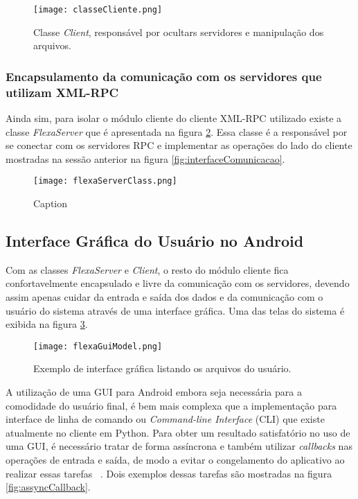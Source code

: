         \begin{figure}[!ht]
        \centering
        \texttt{[image: classeCliente.png]}
        \caption{Classe \textit{Client}, responsável por ocultars servidores e manipulação dos arquivos.}
        \label{fig:clientClass}
        \end{figure}
        
        
         \subsubsection{Encapsulamento da comunicação com os servidores que utilizam XML-RPC}
         
        Ainda sim, para isolar o módulo cliente do cliente XML-RPC utilizado existe a classe \textit{FlexaServer} que é apresentada na figura \ref{fig:flexaServer}. Essa classe é a responsável por se conectar com os servidores RPC e implementar as operações  do lado do cliente mostradas na sessão anterior na figura \ref{fig:interfaceComunicacao}.
        
        \begin{figure}[!ht]
        \centering
        \texttt{[image: flexaServerClass.png]}
        \caption{Caption}
        \label{fig:flexaServer}
        \end{figure}
        
        
        \subsection{Interface Gráfica do Usuário no Android}
        
        Com as classes \textit{FlexaServer} e \textit{Client}, o resto do módulo cliente fica confortavelmente encapsulado e livre da comunicação com os servidores, devendo assim apenas cuidar da entrada e saída dos dados e da comunicação com o usuário do sistema através de uma interface gráfica. Uma das telas do sistema é exibida na figura \ref{fig:flexaGuiModel}.
        
        \begin{figure}[!ht]
        \centering
        \texttt{[image: flexaGuiModel.png]}
        \caption{Exemplo de interface gráfica listando os arquivos do usuário.}
        \label{fig:flexaGuiModel}
        \end{figure}
        
        A utilização de uma GUI para Android embora seja necessária para a comodidade do usuário final, é bem mais complexa que a implementação para interface de linha de comando ou \textit{Command-line Interface} (CLI) que existe atualmente no cliente em Python. Para obter um resultado satisfatório no uso de uma GUI, é necessário tratar de forma assíncrona e também utilizar \textit{callbacks} nas operações de entrada e saída, de modo a evitar o congelamento do aplicativo ao realizar essas tarefas ~\cite{androidAssyncTask}. Dois exemplos dessas tarefas são mostradas na figura \ref{fig:assyncCallback}.
        
